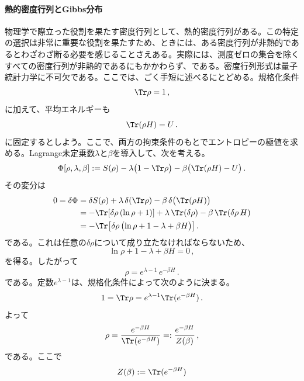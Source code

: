 \documentclass[a4paper,11pt,oneside]{article}
\theoremstyle{definition}
\numberwithin{equation}{section}
\begin{document}
\paragraph{熱的密度行列とGibbs分布} 物理学で際立った役割を果たす密度行列として、熱的密度行列がある。この特定の選択は非常に重要な役割を果たすため、ときには、ある密度行列が非熱的であるとわざわざ断る必要を感じることさえある。実際には、測度ゼロの集合を除くすべての密度行列が非熱的であるにもかかわらず、である。密度行列形式は量子統計力学に不可欠である。ここでは、ごく手短に述べるにとどめる。規格化条件
\begin{equation}
\Tr \rho = 1 \,,
\end{equation}
に加えて、平均エネルギーも
\begin{equation}
\Tr(\rho H)=U \,.
\end{equation}
に固定するとしよう。ここで、両方の拘束条件のもとでエントロピーの極値を求める。Lagrange未定乗数$\lambda$と$\beta$を導入して、次を考える。
\begin{equation}
\Phi[\rho,\lambda,\beta]
:=
S(\rho)-\lambda\bigl(1-\Tr \rho \bigr)-\beta\bigl(\Tr(\rho H)-U\bigr) \,.
\end{equation}
その変分は
\begin{align}
0=\delta \Phi
&=
\delta S(\rho)+\lambda\,\delta(\Tr \rho)-\beta\,\delta\bigl(\Tr(\rho H)\bigr)
\nonumber\\
&=
-\Tr\!\left[\delta \rho\,(\ln \rho +1)\right]
+\lambda\,\Tr(\delta \rho)
-\beta\,\Tr(\delta \rho\, H)
\nonumber\\
&=
-\Tr\!\left[\delta \rho\,\bigl(\ln \rho +1-\lambda+\beta H\bigr)\right] .
\end{align}
である。これは任意の$\delta\rho$について成り立たなければならないため、
\begin{equation}
\ln\rho +1-\lambda+\beta H = 0 \,,
\end{equation}
を得る。したがって
\begin{equation}
\rho = e^{\lambda-1}\,e^{-\beta H} \,.
\end{equation}
である。定数$e^{\lambda-1}$は、規格化条件によって次のように決まる。
\begin{equation}
1 = \Tr \rho = e^{\lambda-1}\Tr(e^{-\beta H}) \,.
\end{equation}
よって
\begin{equation}
\rho
=
\frac{e^{-\beta H}}{\Tr(e^{-\beta H})}
=: \frac{e^{-\beta H}}{Z(\beta)} \,,
\end{equation}
である。ここで
\begin{equation}
Z(\beta) := \Tr(e^{-\beta H})
\end{equation}
\end{document}
